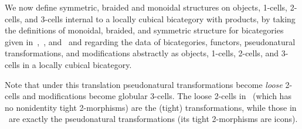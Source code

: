 We now define symmetric, braided and monoidal structures on objects, 1-cells, 2-cells, and 3-cells internal to a locally cubical bicategory with products, by taking the definitions of monoidal, braided, and symmetric structure for bicategories given in~\cite{nick:tricatsbook},~\cite{mccrudden:bal-coalgb}, and~\cite{gg:ldstr-tricat} and regarding the data of bicategories, functors, pseudonatural transformations, and modifications abstractly as objects, 1-cells, 2-cells, and 3-cells in a locally cubical bicategory.

Note that under this translation pseudonatural transformations become \emph{loose} 2-cells and modifications become globular 3-cells.
The loose 2-cells in \cDblf\ (which has no nonidentity tight 2-morphisms) are the (tight) transformations, while those in \fBicat\ are exactly the pseudonatural transformations (its tight 2-morphisms are icons).

